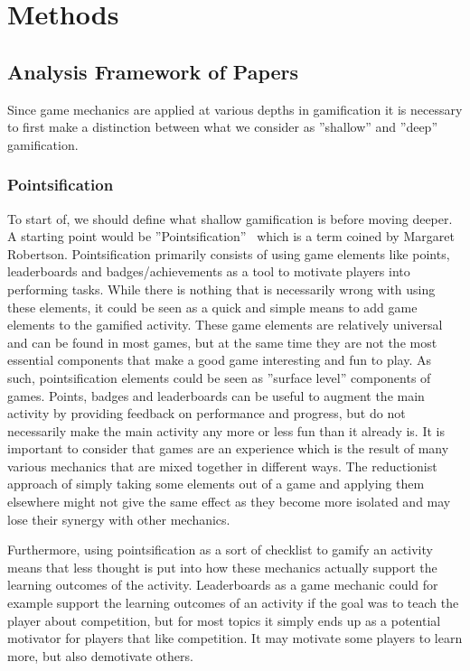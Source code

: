 \section{Methods}
\subsection{Analysis Framework of Papers}    
Since game mechanics are applied at various depths in gamification it is necessary to first make a distinction between what we consider as ''shallow'' and ''deep'' gamification. 

\subsubsection{Pointsification}
To start of, we should define what shallow gamification is before moving deeper. A starting point would be ''Pointsification''~\cite{robertson2010} which is a term coined by Margaret Robertson. Pointsification primarily consists of using game elements like points, leaderboards and badges/achievements as a tool to motivate players into performing tasks. While there is nothing that is necessarily wrong with using these elements, it could be seen as a quick and simple means to add game elements to the gamified activity. These game elements are relatively universal and can be found in most games, but at the same time they are not the most essential components that make a good game interesting and fun to play. As such, pointsification elements could be seen as ''surface level'' components of games. Points, badges and leaderboards can be useful to augment the main activity by providing feedback on performance and progress, but do not necessarily make the main activity any more or less fun than it already is. It is important to consider that games are an experience which is the result of many various mechanics that are mixed together in different ways. The reductionist approach of simply taking some elements out of a game and applying them elsewhere might not give the same effect as they become more isolated and may lose their synergy with other mechanics. 

Furthermore, using pointsification as a sort of checklist to gamify an activity means that less thought is put into how these mechanics actually support the learning outcomes of the activity. Leaderboards as a game mechanic could for example support the learning outcomes of an activity if the goal was to teach the player about competition, but for most topics it simply ends up as a potential motivator for players that like competition. It may motivate some players to learn more, but also demotivate others.

